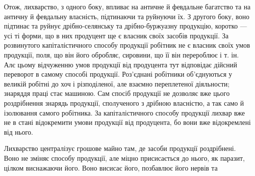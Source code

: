 Отож, лихварство, з одного боку, впливає на античне й февдальне багатство
та на античну й февдальну власність, підтинаючи та руйнуючи їх. З другого
боку, воно підтинає та руйнує дрібно-селянську та дрібно-буржуазну
продукцію, коротко — усі ті форми, що в них продуцент ще є власник своїх
засобів продукції. За розвинутого капіталістичного способу продукції робітник
не є власник своїх умов продукції, поля, що він його обробляє, сировини, що
її він перероблює і т. ін. Алє цьому відчуженню умов продукції від продуцента
тут відповідає дійсний переворот в самому способі продукції. Роз’єднані
робітники об’єднуються у великій робітні до хоч і різподіленої, але взаємно
переплетеної діяльности; знаряддя праці стає машиною. Сам спосіб продукції не
дозволяє вже цього роздрібнення знарядь продукції, сполученого з дрібною власністю,
а так само й ізолювання самого робітника. За капіталістичного способу
продукції лихвар вже не в стані відокремити умови продукції від продуцента, бо
вони вже відокремлені від нього.

Лихварство централізує грошове майно там, де засоби продукції роздрібнені.
Воно не зміняє способу продукції, але міцно присисається до нього, як
паразит, цілком виснажаючи його. Воно висисає його, позбавлює його нервів та
\parbreak{}  %
